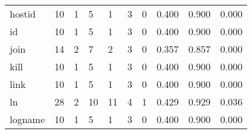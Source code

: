 \begin{longtable}{lp{2.0cm}p{2.0cm}p{2.0cm}p{2.0cm}p{2.0cm}p{2.0cm}p{2.0cm}p{2.0cm}p{2.0cm}}
hostid    &                     10 &                                             1 &                                            5 &                                           1 &                                            3 &                                          0 &                                0.400 &                                  0.900 &                                0.000 \\
id        &                     10 &                                             1 &                                            5 &                                           1 &                                            3 &                                          0 &                                0.400 &                                  0.900 &                                0.000 \\
join      &                     14 &                                             2 &                                            7 &                                           2 &                                            3 &                                          0 &                                0.357 &                                  0.857 &                                0.000 \\
kill      &                     10 &                                             1 &                                            5 &                                           1 &                                            3 &                                          0 &                                0.400 &                                  0.900 &                                0.000 \\
link      &                     10 &                                             1 &                                            5 &                                           1 &                                            3 &                                          0 &                                0.400 &                                  0.900 &                                0.000 \\
ln        &                     28 &                                             2 &                                           10 &                                          11 &                                            4 &                                          1 &                                0.429 &                                  0.929 &                                0.036 \\
logname   &                     10 &                                             1 &                                            5 &                                           1 &                                            3 &                                          0 &                                0.400 &                                  0.900 &                                0.000 \\

\end{longtable}
